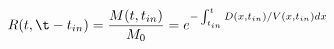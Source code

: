 \begin{equation}
R(t,\t-t_{in}) = \frac{M(t,t_{in})}{M_0} = e^{-\int_{t_{in}}^t D(x,t_{in})/V(x,t_{in}) dx}
\end{equation}